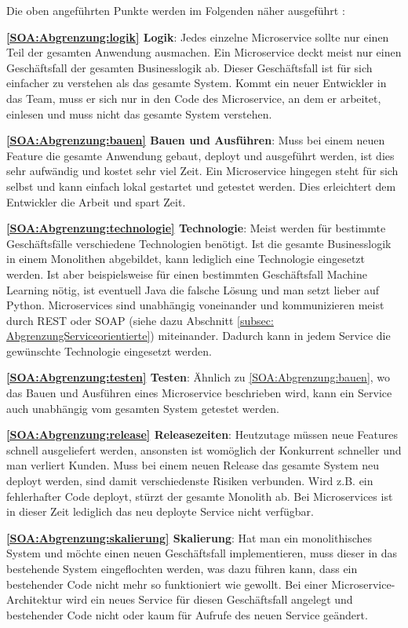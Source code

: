 Die oben angeführten Punkte werden im Folgenden näher ausgeführt \cite{MicroservicesForJavaDevelopers}:

\textbf{\ref{SOA:Abgrenzung:logik} Logik}: Jedes einzelne Microservice sollte nur einen Teil der gesamten Anwendung ausmachen. Ein Microservice deckt meist nur einen Geschäftsfall der gesamten Businesslogik ab. Dieser Geschäftsfall ist für sich einfacher zu verstehen als das gesamte System. Kommt ein neuer Entwickler in das Team, muss er sich nur in den Code des Microservice, an dem er arbeitet, einlesen und muss nicht das gesamte System verstehen.

\textbf{\ref{SOA:Abgrenzung:bauen} Bauen und Ausführen}: Muss bei einem neuen Feature die gesamte Anwendung gebaut, deployt und ausgeführt werden, ist dies sehr aufwändig und kostet sehr viel Zeit. Ein Microservice hingegen steht für sich selbst und kann einfach lokal gestartet und getestet werden. Dies erleichtert dem Entwickler die Arbeit und spart Zeit.

\textbf{\ref{SOA:Abgrenzung:technologie} Technologie}: Meist werden für bestimmte Geschäftsfälle verschiedene Technologien benötigt. Ist die gesamte Businesslogik in einem Monolithen abgebildet, kann lediglich eine Technologie eingesetzt werden. Ist aber beispielsweise für einen bestimmten Geschäftsfall Machine Learning nötig, ist eventuell Java die falsche Lösung und man setzt lieber auf Python.
Microservices sind unabhängig voneinander und kommunizieren meist durch REST oder SOAP (siehe dazu Abschnitt \ref{subsec: AbgrenzungServiceorientierte}) miteinander. Dadurch kann in jedem Service die gewünschte Technologie eingesetzt werden.

\textbf{\ref{SOA:Abgrenzung:testen} Testen}: Ähnlich zu \ref{SOA:Abgrenzung:bauen}, wo das Bauen und Ausführen eines Microservice beschrieben wird, kann ein Service auch unabhängig vom gesamten System getestet werden.

\textbf{\ref{SOA:Abgrenzung:release} Releasezeiten}: Heutzutage müssen neue Features schnell ausgeliefert werden, ansonsten ist womöglich der Konkurrent schneller und man verliert Kunden. Muss bei einem neuen Release das gesamte System neu deployt werden, sind damit verschiedenste Risiken verbunden. Wird z.B. ein fehlerhafter Code deployt, stürzt der gesamte Monolith ab. Bei Microservices ist in dieser Zeit lediglich das neu deployte Service nicht verfügbar.

\textbf{\ref{SOA:Abgrenzung:skalierung} Skalierung}: Hat man ein monolithisches System und möchte einen neuen Geschäftsfall implementieren, muss dieser in das bestehende System eingeflochten werden, was dazu führen kann, dass ein bestehender Code nicht mehr so funktioniert wie gewollt.
Bei einer Microservice-Architektur wird ein neues Service für diesen Geschäftsfall angelegt und bestehender Code nicht oder kaum für Aufrufe des neuen Service geändert.


